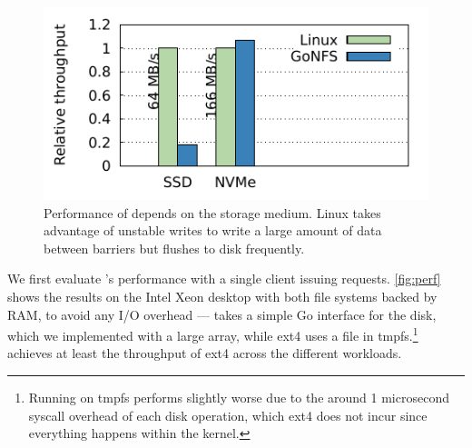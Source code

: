 %
%

\begin{figure}[ht!]
  \centering

  \includegraphics[scale=0.9]{fig/largefile-alt.pdf}
  \caption{Performance of  depends on the storage medium. Linux
    takes advantage of unstable writes to write a large amount of data between
    barriers but \gnfs flushes to disk frequently.}
\label{fig:largefile}
\end{figure}

%
%
%
%
%

We first evaluate \gnfs's performance with a single client issuing requests.
\autoref{fig:perf} shows the results on the Intel Xeon desktop with both file systems backed by RAM, to
avoid any I/O overhead --- \gnfs takes a simple Go interface for the disk, which
we implemented with a large array, while ext4 uses a file in
tmpfs.\footnote{Running \gnfs on tmpfs performs slightly worse due to the around
  1 microsecond syscall overhead of each disk operation, which ext4
  does not incur since everything happens within the kernel.} \gnfs achieves at
least the throughput of ext4 across the different workloads.

